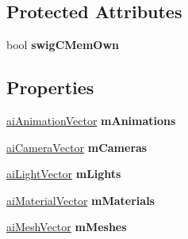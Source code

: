 \subsection*{Protected Attributes}
\begin{DoxyCompactItemize}
\item 
\hypertarget{structai_scene_a82741371f1dc7863bbb53f5252767667}{bool {\bfseries swig\+C\+Mem\+Own}}\label{structai_scene_a82741371f1dc7863bbb53f5252767667}

\end{DoxyCompactItemize}
\subsection*{Properties}
\begin{DoxyCompactItemize}
\item 
\hypertarget{structai_scene_a20714d01120312728bc27171e642ea1e}{\hyperlink{classai_animation_vector}{ai\+Animation\+Vector} {\bfseries m\+Animations}}\label{structai_scene_a20714d01120312728bc27171e642ea1e}

\item 
\hypertarget{structai_scene_a904f4b4784353dd40e3689421ab3b15b}{\hyperlink{classai_camera_vector}{ai\+Camera\+Vector} {\bfseries m\+Cameras}}\label{structai_scene_a904f4b4784353dd40e3689421ab3b15b}

\item 
\hypertarget{structai_scene_a23eacb26c9f673fc69f68bd7f615a09e}{\hyperlink{classai_light_vector}{ai\+Light\+Vector} {\bfseries m\+Lights}}\label{structai_scene_a23eacb26c9f673fc69f68bd7f615a09e}

\item 
\hypertarget{structai_scene_a5161a78f45414c39ab2645d3738d7cfb}{\hyperlink{classai_material_vector}{ai\+Material\+Vector} {\bfseries m\+Materials}}\label{structai_scene_a5161a78f45414c39ab2645d3738d7cfb}

\item 
\hypertarget{structai_scene_a2341160037b234ca383e7466e9982ae9}{\hyperlink{classai_mesh_vector}{ai\+Mesh\+Vector} {\bfseries m\+Meshes}}\label{structai_scene_a2341160037b234ca383e7466e9982ae9}


\end{DoxyCompactItemize}
